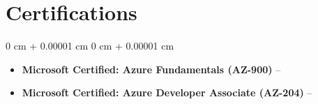 \documentclass[10pt, letterpaper]{article}
\newenvironment{highlights}{
    \begin{itemize}[
        topsep=0.04 cm,
        parsep=0.04 cm,
        partopsep=0pt,
        itemsep=0pt,
        leftmargin=0 cm + 10pt
    ]
}{
    \end{itemize}
}
\newenvironment{onecolentry}{
    \begin{adjustwidth}{
        0 cm + 0.00001 cm
    }{
        0 cm + 0.00001 cm
    }
}{
    \end{adjustwidth}
}
\begin{document}
\section{Certifications}
\begin{onecolentry}
    \begin{highlights}
        \item \textbf{Microsoft Certified: Azure Fundamentals (AZ-900)} -- \href{https://learn.microsoft.com/api/credentials/share/en-us/KushwahaManish-1510/4EF4DCA8B4581C86?sharingId=479F516FA4455767}{\faExternalLink}
        \item \textbf{Microsoft Certified: Azure Developer Associate (AZ-204)} -- \href{https://learn.microsoft.com/api/credentials/share/en-us/KushwahaManish-1510/6BC4A82A5353552E?sharingId=479F516FA4455767}{\faExternalLink}
    \end{highlights}
\end{onecolentry}
\end{document}
